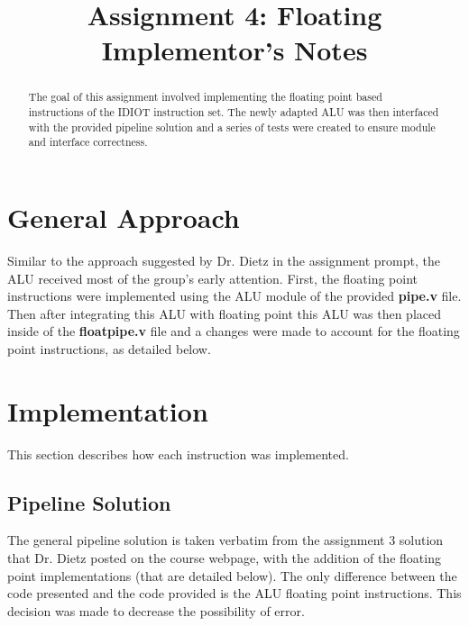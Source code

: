 \documentclass[conference]{IEEEtran}
\begin{document}
\title{Assignment 4: Floating\\Implementor's Notes}
\author{
        }

\maketitle

\begin{abstract}
The goal of this assignment involved implementing the floating point based
instructions of the IDIOT instruction set. The newly adapted ALU was then
interfaced with the provided pipeline solution and a series of tests were created
to ensure module and interface correctness.
\end{abstract}

\section{General Approach}
Similar to the approach suggested by Dr. Dietz in the assignment prompt, the ALU
received most of the group's early attention. First, the floating point instructions were 
implemented using the ALU module of the provided \textbf{pipe.v} file. Then after integrating
this ALU with floating point this ALU was then placed inside of the \textbf{floatpipe.v} file and a 
 changes were made to account for the floating point instructions, as detailed below.  

\section{Implementation}
This section describes how each instruction was implemented.

\subsection{Pipeline Solution}
The general pipeline solution is taken verbatim from the assignment 3 solution that Dr. Dietz
posted on the course webpage, with the addition of the floating point implementations (that 
are detailed below). The only difference between the code presented and the code provided
is the ALU floating point instructions. This decision was made to decrease the possibility of error. 
\end{document}
